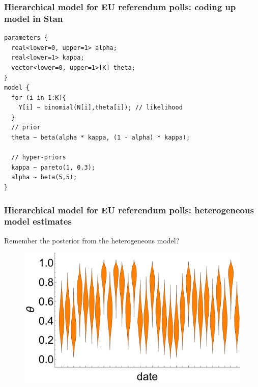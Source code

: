 \documentclass[handout]{beamer}
\begin{document}
\begin{frame}[fragile]
	\frametitle{Hierarchical model for EU referendum polls: coding up model in Stan}
	
	\begin{verbatim}
parameters {
  real<lower=0, upper=1> alpha;
  real<lower=1> kappa; 
  vector<lower=0, upper=1>[K] theta; 
} 
model {
  for (i in 1:K){
    Y[i] ~ binomial(N[i],theta[i]); // likelihood
  }  
  // prior
  theta ~ beta(alpha * kappa, (1 - alpha) * kappa); 

  // hyper-priors
  kappa ~ pareto(1, 0.3);
  alpha ~ beta(5,5);
}
	\end{verbatim}
	
\end{frame}

\begin{frame}[fragile]
	\frametitle{Hierarchical model for EU referendum polls: heterogeneous model estimates}
	 Remember the posterior from the heterogeneous model?
	\onslide<3->
	\begin{figure}[ht]
		\centerline{\includegraphics[width=1\textwidth]{figures/lec6_euHeteroPosterior.pdf}}
	\end{figure}
	
\end{frame}
\end{document}
